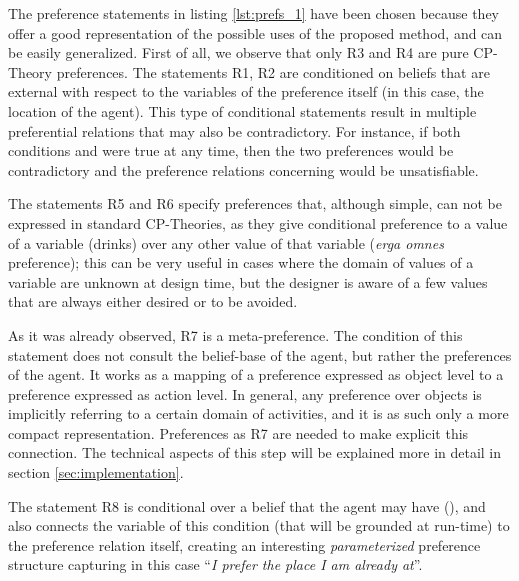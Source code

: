 The preference statements in listing \ref{lst:prefs_1} have been chosen because they offer a good representation of the possible uses of the proposed method, and can be easily generalized. First of all, we observe that only R3 and R4 are pure CP-Theory preferences. The statements R1, R2 are conditioned on beliefs that are external with respect to the variables of the preference itself (in this case, the location of the agent). This type of conditional statements result in multiple preferential relations that may also be contradictory. %
For instance, if both conditions  and  were true at any time, then the two preferences would be contradictory and the preference relations concerning  would be unsatisfiable.

The statements R5 and R6 specify preferences that, although simple, can not be expressed in standard CP-Theories, as they give conditional preference to a value of a variable (drinks) over any other value of that variable (\textit{erga omnes} preference); this can be very useful in cases where the domain of values of a variable are unknown at design time, but the designer is aware of a few values that are always either desired or to be avoided. 

As it was already observed, R7 is a meta-preference. The condition of this statement does not consult the belief-base of the agent, but rather the preferences of the agent. It works as a mapping of a preference expressed as object level to a preference expressed as action level. In general, any preference over objects is implicitly referring to a certain domain of activities, and it is as such only a more compact representation. Preferences as R7 are needed to make explicit this connection. The technical aspects of this step will be explained more in detail in section \ref{sec:implementation}. 

The statement R8 is conditional over a belief that the agent may have (), and also connects the variable of this condition  (that will be grounded at run-time) to the preference relation itself, creating an interesting \textit{parameterized} preference structure capturing in this case ``\textit{I prefer the place I am already at}''. 

